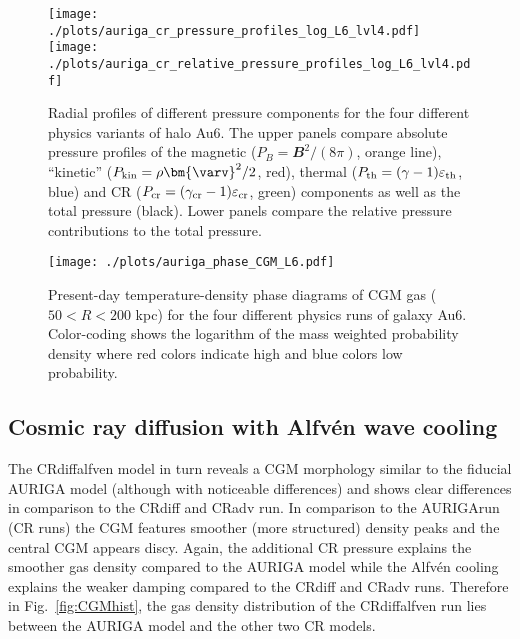 \documentclass[useAMS,usenatbib]{mnras}
\newcommand{\eps}{\varepsilon}
\newcommand{\bvel}{\ensuremath{\bm{\varv}}}
\newcommand{\bB}{\ensuremath{\mathbfit{B}}}
\begin{document}
\begin{figure*}
\begin{center}
\texttt{[image: ./plots/auriga\_cr\_pressure\_profiles\_log\_L6\_lvl4.pdf]}
\texttt{[image: ./plots/auriga\_cr\_relative\_pressure\_profiles\_log\_L6\_lvl4.pdf]}
\end{center}
\vspace{-.35cm}
\caption{Radial profiles of different pressure components for the four different physics variants of halo Au6. The upper panels compare absolute pressure profiles of the magnetic ($P_{B}=\bB^2/(8\pi)$, orange line), ``kinetic'' ($P_{\rm kin}=\rho \bvel^2/2$, red), thermal ($P_{\rm th}=(\gamma-1)\eps_{\rm th}$, blue) and CR ($P_{\rm cr}=(\gamma_{\rm cr}-1)\eps_{\rm cr}$, green) components as well as the total pressure (black). Lower panels compare the relative pressure contributions to the total pressure.}
\label{fig:pressure}
\end{figure*}


\begin{figure*}
\vspace{-.25cm}
\begin{center}
\texttt{[image: ./plots/auriga\_phase\_CGM\_L6.pdf]}
\end{center}
\vspace{-.35cm}
\caption{Present-day temperature-density phase diagrams of CGM gas ($50<R<200$ kpc) for the four different physics runs of galaxy Au6. Color-coding shows the logarithm of the mass weighted probability density where red colors indicate high and blue colors low probability.}
\label{fig:phase}
\end{figure*}


\subsection{Cosmic ray diffusion with Alfv\'en wave cooling}
The CRdiffalfven model in turn reveals a CGM morphology similar to the fiducial AURIGA model (although with noticeable differences) and shows clear differences in comparison to the CRdiff and CRadv run. In comparison to the AURIGArun (CR runs) the CGM features smoother (more structured) density peaks and the central CGM appears discy. Again, the additional CR pressure explains the smoother gas density compared to the AURIGA model while the Alfv\'en cooling explains the weaker damping compared to the CRdiff and CRadv runs. Therefore in Fig.\ \ref{fig:CGMhist}, the gas density distribution of the CRdiffalfven run lies between the AURIGA model and the other two CR models. 
\end{document}
